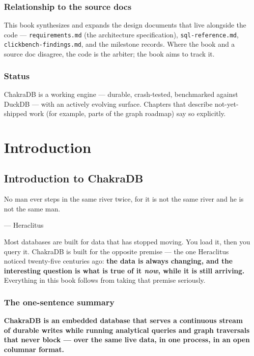 \documentclass[
  11pt,
  openany]{book}
\begin{document}
\section{Relationship to the source
docs}\label{relationship-to-the-source-docs}

This book synthesizes and expands the design documents that live
alongside the code --- \texttt{requirements.md} (the architecture
specification), \texttt{sql-reference.md},
\texttt{clickbench-findings.md}, and the milestone records. Where the
book and a source doc disagree, the code is the arbiter; the book aims
to track it.

\section{Status}\label{status}

ChakraDB is a working engine --- durable, crash-tested, benchmarked
against DuckDB --- with an actively evolving surface. Chapters that
describe not-yet-shipped work (for example, parts of the graph roadmap)
say so explicitly.

\part{Introduction}

\chapter{Introduction to ChakraDB}\label{introduction-to-chakradb}

\epigraph{No man ever steps in the same river twice, for it is not the same river and he is not the same man.}{--- Heraclitus}

Most databases are built for data that has stopped moving. You load it,
then you query it. ChakraDB is built for the opposite premise --- the
one Heraclitus noticed twenty-five centuries ago: \textbf{the data is
always changing, and the interesting question is what is true of it
\emph{now}, while it is still arriving.} Everything in this book follows
from taking that premise seriously.

\section{The one-sentence summary}\label{the-one-sentence-summary}

\textbf{ChakraDB is an embedded database that serves a continuous stream
of durable writes while running analytical queries and graph traversals
that never block --- over the same live data, in one process, in an open
columnar format.}
\end{document}
